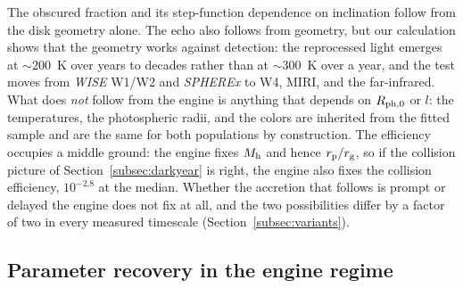 \documentclass[twocolumn,pdftex]{aastex701}
\newcommand{\wise}{{\it WISE}\xspace}
\newcommand{\spherex}{{\it SPHEREx}\xspace}
\begin{document}
The obscured fraction and its step-function dependence on inclination follow from the disk geometry alone. The echo also follows from geometry, but our calculation shows that the geometry works against detection: the reprocessed light emerges at $\sim 200$~K over years to decades rather than at $\sim 300$~K over a year, and the test moves from \wise W1/W2 and \spherex to W4, MIRI, and the far-infrared. What does {\it not} follow from the engine is anything that depends on $R_{\rm ph,0}$ or $l$: the temperatures, the photospheric radii, and the colors are inherited from the fitted sample and are the same for both populations by construction. The efficiency occupies a middle ground: the engine fixes $M_{\rm h}$ and hence $r_{\rm p}/r_{\rm g}$, so if the collision picture of Section~\ref{subsec:darkyear} is right, the engine also fixes the collision efficiency, $10^{-2.8}$ at the median. Whether the accretion that follows is prompt or delayed the engine does not fix at all, and the two possibilities differ by a factor of two in every measured timescale (Section~\ref{subsec:variants}).

\subsection{Parameter recovery in the engine regime}\label{subsec:recovery}
\end{document}
